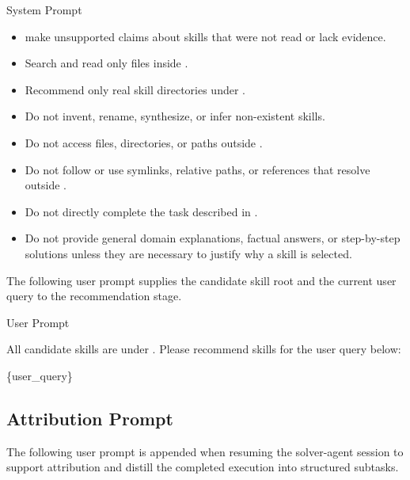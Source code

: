 \begin{svpromptbox}{System Prompt}
\begin{itemize}
\item make unsupported claims about skills that were not read or lack evidence.
\end{itemize}
\smallskip
{}
\smallskip
\begin{itemize}
\item Search and read only files inside .
\item Recommend only real skill directories under .
\item Do not invent, rename, synthesize, or infer non-existent skills.
\item Do not access files, directories, or paths outside .
\item Do not follow or use symlinks, relative paths, or references that resolve outside .
\item Do not directly complete the task described in .
\item Do not provide general domain explanations, factual answers, or step-by-step solutions unless they are necessary to justify why a skill is selected.
\end{itemize}

\end{svpromptbox}

\noindent The following user prompt supplies the candidate skill root and the current user query to the recommendation stage.\par

\begin{svpromptbox}{User Prompt}

All candidate skills are under . Please recommend skills for the user query below:\par
\{user\_query\}\par

\end{svpromptbox}

\subsection{Attribution Prompt}


\noindent The following user prompt is appended when resuming the solver-agent session to support attribution and distill the completed execution into structured subtasks.\par

